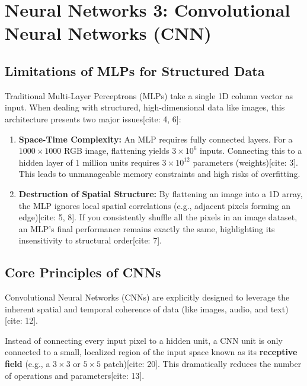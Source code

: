 \chapter*{Neural Networks 3: Convolutional Neural Networks (CNN)}

\section*{Limitations of MLPs for Structured Data}

Traditional Multi-Layer Perceptrons (MLPs) take a single 1D column vector as input. When dealing with structured, high-dimensional data like images, this architecture presents two major issues[cite: 4, 6]:
\begin{enumerate}
    \item \textbf{Space-Time Complexity:} An MLP requires fully connected layers. For a $1000 \times 1000$ RGB image, flattening yields $3 \times 10^6$ inputs. Connecting this to a hidden layer of 1 million units requires $3 \times 10^{12}$ parameters (weights)[cite: 3]. This leads to unmanageable memory constraints and high risks of overfitting.
    \item \textbf{Destruction of Spatial Structure:} By flattening an image into a 1D array, the MLP ignores local spatial correlations (e.g., adjacent pixels forming an edge)[cite: 5, 8]. If you consistently shuffle all the pixels in an image dataset, an MLP's final performance remains exactly the same, highlighting its insensitivity to structural order[cite: 7].
\end{enumerate}

\section*{Core Principles of CNNs}

Convolutional Neural Networks (CNNs) are explicitly designed to leverage the inherent spatial and temporal coherence of data (like images, audio, and text)[cite: 12].

\begin{definition}
Instead of connecting every input pixel to a hidden unit, a CNN unit is only connected to a small, localized region of the input space known as its \textbf{receptive field} (e.g., a $3 \times 3$ or $5 \times 5$ patch)[cite: 20]. This dramatically reduces the number of operations and parameters[cite: 13].
\end{definition}

